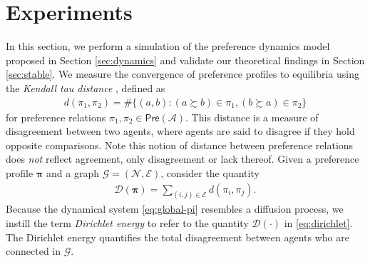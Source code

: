 \documentclass[conference]{ieeeconf}
\newcommand{\N}{\mathcal{N}}
\newcommand{\A}{\mathcal{A}}
\newcommand{\G}{\mathcal{G}}
\newcommand{\E}{\mathcal{E}}
\newcommand{\D}{\mathcal{D}}
\newcommand{\Pref}{\mathsf{Pre}}
\newcommand{\prefers}{\succsim}
\newcommand{\profile}{\boldsymbol{\pi}}
\newcommand{\meet}{\wedge}
\newcommand{\bigmeet}{\bigwedge}
\newtheorem{example}{Example}
\begin{document}

\vspace{-1em}
\section{Experiments}
\label{sec:experiments}

In this section, we perform a simulation of the preference dynamics model proposed in Section \ref{sec:dynamics} and validate our theoretical findings in Section \ref{sec:stable}. We measure the convergence of preference profiles to equilibria using the \emph{Kendall tau distance} \cite{kendall1938}, defined as
\begin{align}
        d(\pi_1,\pi_2) =  \#\{ (a,b) : (a \prefers b) \in \pi_1, (b \prefers a) \in \pi_2  \} \label{eq:kendall}
    \end{align}
for preference relations $\pi_1, \pi_2 \in \Pref(\A)$. This distance is a measure of disagreement between two agents, where agents are said to disagree if they hold opposite comparisons. Note this notion of distance between preference relations does \emph{not} reflect agreement, only disagreement or lack thereof. Given a preference profile $\profile$ and a graph $\G = (\N,\E)$, consider the quantity
\begin{align}
    \D(\profile) = \sum_{(i,j) \in \E} d(\pi_i,\pi_j). \label{eq:dirichlet}
\end{align}
Because the dynamical system \eqref{eq:global-pi} resembles a diffusion process, we instill the term \emph{Dirichlet energy} to refer to the quantity $\D(\cdot)$ in \eqref{eq:dirichlet}. The Dirichlet energy quantifies the total disagreement between agents who are connected in $\G$. 
\end{document}
